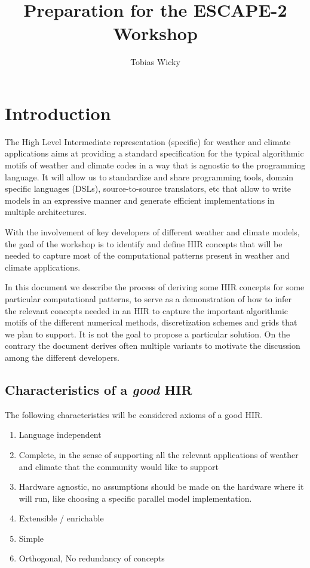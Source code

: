 \documentclass[a4paper,10pt]{scrartcl}
\title{Preparation for the ESCAPE-2 Workshop}
\author{Tobias Wicky}
\begin{document}
\maketitle

\section{Introduction}

The High Level Intermediate representation (specific) for weather and
climate applications aims at providing a standard specification for
the typical algorithmic motifs of weather and climate codes
in a way that is agnostic to the programming language. 
It will allow us to standardize and share programming tools, domain specific languages (DSLs), source-to-source translators, etc that allow to write
models in an expressive manner and generate efficient implementations
in multiple architectures.

With the involvement of key developers of different weather and climate
models, the goal of the workshop is to identify and define HIR concepts
that will be needed to capture most of the computational
patterns present in weather and climate applications.

In this document we describe the process of deriving some HIR concepts 
for some particular computational patterns, to 
serve as a demonstration of how to infer the relevant concepts needed in an HIR to capture the important algorithmic motifs of the different numerical methods, discretization schemes and grids that we plan to support.
It is not the goal to propose a particular solution. On the contrary the document derives often multiple variants to motivate the discussion among the different developers. 

\subsection{Characteristics of a  \textit{good} HIR}
The following characteristics will be considered axioms of a good HIR.
\label{sec:HIRDef}
\begin{enumerate}[label=\textbf{A.\arabic*}]
    \item Language independent 
    \item Complete, in the sense of supporting all the relevant applications of weather and climate that the community would like to support
    \item Hardware agnostic, no assumptions should be made on the hardware where it will run, like choosing a specific parallel model implementation. \label{A:hardware}
    \item Extensible / enrichable
    \item Simple
    \item Orthogonal, No redundancy of concepts \label{A:ortho}
\end{enumerate}
\end{document}
